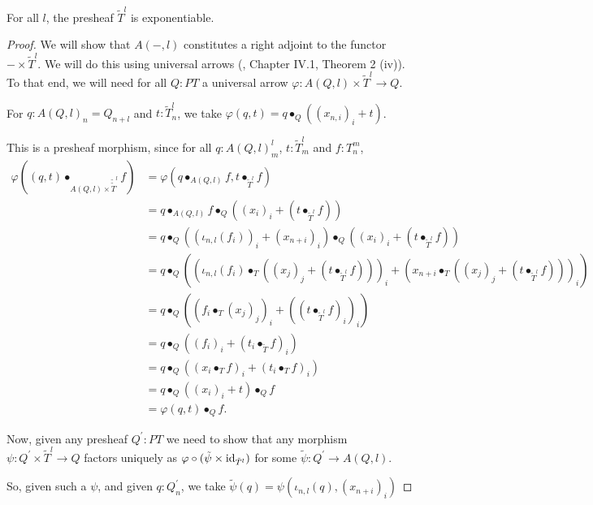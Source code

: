 \begin{lemma}
  For all $ l $, the presheaf $ \tilde T^l $ is exponentiable.
\end{lemma}
\begin{proof}
  We will show that $ A(-, l) $ constitutes a right adjoint to the functor $ - \times \tilde T^l $. We will do this using universal arrows (\cite{MacLane}, Chapter IV.1, Theorem 2 (iv)). To that end, we will need for all $ Q: PT $ a universal arrow $ \varphi: A(Q, l) \times \tilde T^l \to Q $.

  For $ q: A(Q, l)_n = Q_{n + l} $ and $ t: \tilde T^l_n $, we take $ \varphi(q, t) = q \bullet_Q ((x_{n, i})_i + t) $.

  This is a presheaf morphism, since for all $ q: A(Q, l)^l_m $, $ t: \tilde T^l_m $ and $ f: T_n^m $,
  \begin{align*}
    \varphi((q, t) \bullet_{A(Q, l) \times \tilde \tilde T^l} f) &= \varphi(q \bullet_{A(Q, l)} f, t \bullet_{\tilde T^l} f)\\
    &= q \bullet_{A(Q, l)} f \bullet_Q ((x_i)_i + (t \bullet_{\tilde T^l} f))\\
    &= q \bullet_Q ((\iota_{n, l}(f_i))_i + (x_{n + i})_i) \bullet_Q ((x_i)_i + (t \bullet_{\tilde T^l} f))\\
    &= q \bullet_Q ((\iota_{n, l}(f_i) \bullet_T ((x_j)_j + (t \bullet_{\tilde T^l} f)))_i + (x_{n + i} \bullet_T ((x_j)_j + (t \bullet_{\tilde T^l} f)))_i)\\
    &= q \bullet_Q ((f_i \bullet_T (x_j)_j)_i + ((t \bullet_{\tilde T^l} f)_i)_i)\\
    &= q \bullet_Q ((f_i)_i + (t_i \bullet_{\tilde T} f)_i)\\
    &= q \bullet_Q ((x_i \bullet_T f)_i + (t_i \bullet_T f)_i)\\
    &= q \bullet_Q ((x_i)_i + t) \bullet_Q f\\
    &= \varphi(q, t) \bullet_Q f.
  \end{align*}

  Now, given any presheaf $ Q^\prime : P T $ we need to show that any morphism $ \psi: Q^\prime \times \tilde T^l \to Q $ factors uniquely as $ \varphi \circ (\tilde \psi \times \text{id}_{\tilde T^l}) $ for some $ \tilde \psi: Q^\prime \to A(Q, l) $.

  So, given such a $ \psi $, and given $ q: Q^\prime_n $, we take $ \tilde \psi(q) = \psi(\iota_{n, l}(q), (x_{n + i})_i) $


\end{proof}
